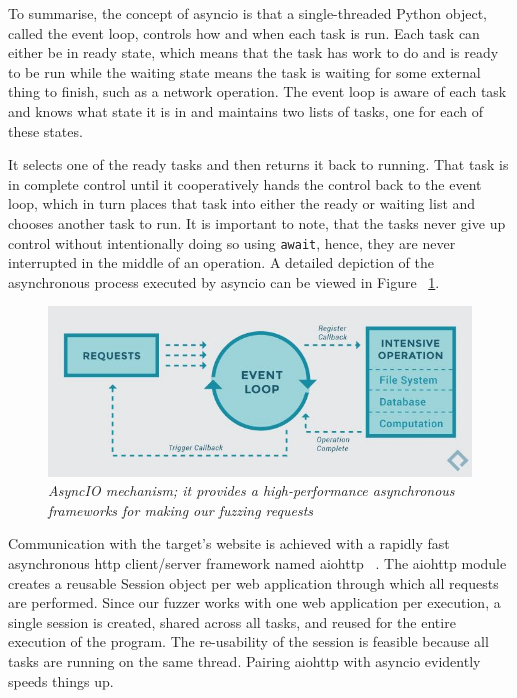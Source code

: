 To summarise, the concept of asyncio is that a single-threaded Python object, called the event loop, controls how and when each task is run. Each task can either be in ready state, which means that the task has work to do and is ready to be run while the waiting state means the task is waiting for some external thing to finish, such as a network operation. The event loop is aware of each task and knows what state it is in and maintains two lists of tasks, one for each of these states. 

It selects one of the ready tasks and then returns it back to running. That task is in complete control until it cooperatively hands the control back to the event loop, which in turn places that task into either the ready or waiting list and chooses another task to run. It is important to note, that the tasks never give up control without intentionally doing so using {\tt await}, hence, they are never interrupted in the middle of an operation. A detailed depiction of the asynchronous process executed by asyncio can be viewed in Figure ~\ref{fig:asyncio_image_source}.

\begin{figure}[ht]
 \centering
 \captionsetup{justification=centering}
 \includegraphics[width=\linewidth]{figures/asyncio_process.jpg}
 \caption[AsyncIO mechanism]
 {\textit{AsyncIO mechanism; it provides a high-performance asynchronous frameworks for making our fuzzing requests} ~\cite{asyncio_image_source}}
 \label{fig:asyncio_image_source}
\end{figure}

Communication with the target's website is achieved with a rapidly fast asynchronous http client/server framework named aiohttp ~\cite{aiohttp}. The aiohttp module creates a reusable Session object per web application through which all requests are performed. Since our fuzzer works with one web application per execution, a single session is created, shared across all tasks, and reused for the entire execution of the program. The re-usability of the session is feasible because all tasks are running on the same thread. Pairing aiohttp with asyncio evidently speeds things up.

